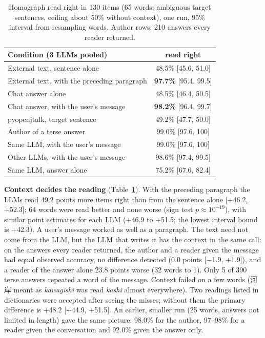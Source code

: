\documentclass{Interspeech}
\begin{document}
\begin{table}[t]
\centering\footnotesize
\caption{Homograph read right in 130 items (65 words; ambiguous target sentences, ceiling about 50\% without
context), one run, 95\% interval from resampling words. Author rows: 210 answers every reader returned.}
\label{tab:context}
\setlength{\tabcolsep}{3pt}
\begin{tabular}{lc}
\toprule
Condition (3 LLMs pooled) & read right\\
\midrule
External text, sentence alone & 48.5\% [45.6, 51.0]\\
External text, with the preceding paragraph & \textbf{97.7\%} [95.4, 99.5]\\
Chat answer alone & 48.5\% [46.4, 50.5]\\
Chat answer, with the user's message & \textbf{98.2\%} [96.4, 99.7]\\
pyopenjtalk, target sentence & 49.2\% [47.7, 50.0]\\
\midrule
Author of a terse answer & 99.0\% [97.6, 100]\\
Same LLM, with the user's message & 99.0\% [97.6, 100]\\
Other LLMs, with the user's message & 98.6\% [97.4, 99.5]\\
Same LLM, answer alone & 75.2\% [67.6, 82.4]\\
\bottomrule
\end{tabular}
\end{table}

\textbf{Context decides the reading} (Table~\ref{tab:context}). With the preceding paragraph the LLMs read 49.2 points
more items right than from the sentence alone [+46.2, +52.3]; 64 words were read better and none worse (sign test
$p \approx 10^{-19}$), with similar point estimates for each LLM (+46.9 to +51.5; the lowest interval bound is +42.3). A user's message worked as well as a
paragraph. The text need not come from the LLM, but the LLM that writes it has the context in the same call: on the
answers every reader returned, the author and a reader given the message had equal observed accuracy, no difference detected (0.0 points
[$-$1.9, +1.9]), and a reader of the answer alone 23.8 points worse (32 words to 1). Only 5 of 390 terse answers
repeated a word of the message. Context failed on a few words (河岸 meant as \emph{kawagishi} was read \emph{kashi}
almost everywhere). Two readings listed in dictionaries were accepted after seeing the misses; without them the
primary difference is +48.2 [+44.9, +51.5]. An earlier, smaller run (25 words, answers not limited in length) gave
the same picture: 98.0\% for the author, 97--98\% for a reader given the conversation and 92.0\% given the answer only.
\end{document}
